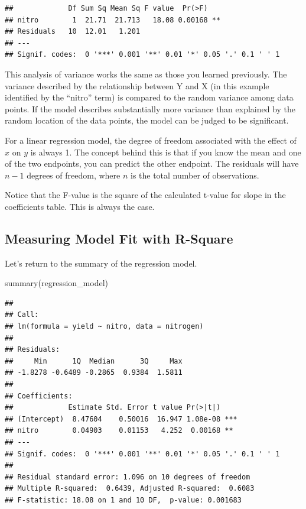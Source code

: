 \documentclass[
]{book}
\newenvironment{Shaded}{\begin{snugshade}}{\end{snugshade}}
\newcommand{\FunctionTok}[1]{\textcolor[rgb]{0.00,0.00,0.00}{#1}}
\newcommand{\NormalTok}[1]{#1}
\begin{document}
\begin{verbatim}
##             Df Sum Sq Mean Sq F value  Pr(>F)   
## nitro        1  21.71  21.713   18.08 0.00168 **
## Residuals   10  12.01   1.201                   
## ---
## Signif. codes:  0 '***' 0.001 '**' 0.01 '*' 0.05 '.' 0.1 ' ' 1
\end{verbatim}

This analysis of variance works the same as those you learned previously. The variance described by the relationship between Y and X (in this example identified by the ``nitro'' term) is compared to the random variance among data points. If the model describes substantially more variance than explained by the random location of the data points, the model can be judged to be significant.

For a linear regression model, the degree of freedom associated with the effect of \(x\) on \(y\) is always 1. The concept behind this is that if you know the mean and one of the two endpoints, you can predict the other endpoint. The residuals will have \(n-1\) degrees of freedom, where \(n\) is the total number of observations.

Notice that the F-value is the square of the calculated t-value for slope in the coefficients table. This is always the case.

\hypertarget{measuring-model-fit-with-r-square}{%
\subsection{Measuring Model Fit with R-Square}\label{measuring-model-fit-with-r-square}}

Let's return to the summary of the regression model.

\begin{Shaded}
\begin{Highlighting}[]
\FunctionTok{summary}\NormalTok{(regression\_model)}
\end{Highlighting}
\end{Shaded}

\begin{verbatim}
## 
## Call:
## lm(formula = yield ~ nitro, data = nitrogen)
## 
## Residuals:
##     Min      1Q  Median      3Q     Max 
## -1.8278 -0.6489 -0.2865  0.9384  1.5811 
## 
## Coefficients:
##             Estimate Std. Error t value Pr(>|t|)    
## (Intercept)  8.47604    0.50016  16.947 1.08e-08 ***
## nitro        0.04903    0.01153   4.252  0.00168 ** 
## ---
## Signif. codes:  0 '***' 0.001 '**' 0.01 '*' 0.05 '.' 0.1 ' ' 1
## 
## Residual standard error: 1.096 on 10 degrees of freedom
## Multiple R-squared:  0.6439, Adjusted R-squared:  0.6083 
## F-statistic: 18.08 on 1 and 10 DF,  p-value: 0.001683
\end{verbatim}
\end{document}
